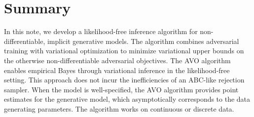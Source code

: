 \documentclass[twocolumn,superscriptaddress,aps]{revtex4-1}
\newcommand{\bftheta}{{\bm \theta}}
\newcommand{\bfpsi}{{\bm \psi}}
\newcommand{\bfphi}{{\bm \phi}}
\newcommand{\bfx}{\mathbf{x}}
\theoremstyle{plain}
\begin{document}
%
%
%
%
%





\section{Summary}

In this note, we develop a likelihood-free inference algorithm for
non-differentiable, implicit generative models. The algorithm combines
adversarial training  with variational optimization to minimize variational
upper bounds  on the otherwise non-differentiable adversarial objectives. The
AVO algorithm enables empirical Bayes through variational inference in the
likelihood-free setting. This approach does not incur the inefficiencies of an
ABC-like rejection sampler. When the model is well-specified, the AVO algorithm
provides point estimates for
the generative model, which asymptotically corresponds to the data generating
parameters. The algorithm works on continuous or discrete data.
\end{document}
